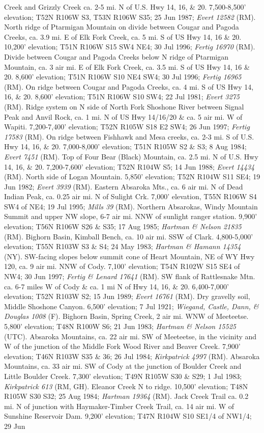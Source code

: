 Creek and Grizzly Creek ca. 2-5 mi. N of U.S. Hwy 14, 16, \& 20. 7,500-8,500’ elevation; T52N R106W S3, T53N R106W S35; 25 Jun 1987; \textit{Evert 12582} (RM).  North ridge of Ptarmigan Mountain on divide between Cougar and Pagoda Creeks, ca. 3.9 mi. E of Elk Fork Creek, ca. 5 mi. S of US Hwy 14, 16 \& 20. 10,200’ elevation; T51N R106W S15 SW4 NE4; 30 Jul 1996; \textit{Fertig 16970} (RM).  Divide between Cougar and Pagoda Creeks below N ridge of Ptarmigan Mountain, ca. 3 air mi. E of Elk Fork Creek, ca. 3.5 mi. S of US Hwy 14, 16 \& 20. 8,600’ elevation; T51N R106W S10 NE4 SW4; 30 Jul 1996; \textit{Fertig 16965} (RM).  On ridge between Cougar and Pagoda Creeks, ca. 4 mi. S of US Hwy 14, 16, \& 20. 8,600’ elevation; T51N R106W S10 SW4; 22 Jul 1981; \textit{Evert 3275} (RM).  Ridge system on N side of North Fork Shoshone River between Signal Peak and Anvil Rock, ca. 1 mi. N of US Hwy 14/16/20 \& ca. 5 air mi. W of Wapiti. 7,200-7,400’ elevation; T52N R105W S18 E2 SW4; 26 Jun 1997; \textit{Fertig 17583} (RM).  On ridge between Fishhawk and Mesa creeks, ca. 2-3 mi. S of U.S. Hwy 14, 16, \& 20. 7,000-8,000’ elevation; T51N R105W S2 \& S3; 8 Aug 1984; \textit{Evert 7451} (RM).  Top of Four Bear (Black) Mountain, ca. 2.5 mi. N of U.S. Hwy 14, 16, \& 20. 7,200-7,600’ elevation; T52N R104W S5; 14 Jun 1988; \textit{Evert 14434} (RM).  North side of Logan Mountain. 5,850’ elevation; T52N R104W S11 SE4; 19 Jun 1982; \textit{Evert 3939} (RM).  Eastern Absaroka Mts., ca. 6 air mi. N of Dead Indian Peak, ca. 0.25 air mi. N of Sulight Crk.  7,000’ elevation, T55N R106W S4 SW4 of NE4; 19 Jul 1995; \textit{Mills 39} (RM).  Northern Absarokas, Windy Mountain Summit and upper NW slope, 6-7 air mi. NNW of sunlight ranger station.  9,900’ elevation; T56N R106W S26 \& S35; 17 Aug 1985; \textit{Hartman \& Nelson 21835} (RM).  Bighorn Basin, Kimball Bench, ca. 10 air mi. SSW of Clark.  4,800-5,000’ elevation; T55N R103W S3 \& S4; 24 May 1983; \textit{Hartman \& Hamann 14354} (NY).  SW-facing slopes below summit cone of Heart Mountain, NE of WY Hwy 120, ca. 9 air mi. NNW of Cody.  7,100’ elevation; T54N R102W S15 SE4 of NW4; 30 Jun 1997; \textit{Fertig \& Lenard 17641} (RM).  SW flank of Rattlesnake Mtn. ca. 6-7 miles W of Cody \& ca. 1 mi N of Hwy 14, 16, \& 20. 6,400-7,000' elevation; T52N R103W S2; 15 Jun 1989; \textit{Evert 16761} (RM).  Dry gravelly soil, Middle Shoshone Canyon.  6,500’ elevation; 7 Jul 1921; \textit{Wiegand, Castle, Dann, \& Douglas 1008} (F).  Bighorn Basin, Spring Creek, 2 air mi. WNW of Meeteetse.  5,800’ elevation; T48N R100W S6; 21 Jun 1983; \textit{Hartman \& Nelson 15525} (UTC).  Absaroka Mountains, ca. 22 air mi. SW of Meeteetse, in the vicinity and W of the junction of the Middle Fork Wood River and Beaver Creek.  7,900’ elevation; T46N R103W S35 \& 36; 26 Jul 1984; \textit{Kirkpatrick 4997} (RM).  Absaroka Mountains, ca. 33 air mi. SW of Cody at the junction of Boulder Creek and Little Boulder Creek. 7,300’ elevation; T49N R105W S30 \& S29; 1 Jul 1983; \textit{Kirkpatrick 613} (RM, GH).  Eleanor Creek N to ridge. 10,500’ elevation; T48N R105W S30 S32; 25 Aug 1984; \textit{Hartman 19364} (RM).  Jack Creek Trail ca. 0.2 mi. N of junction with Haymaker-Timber Creek Trail, ca. 14 air mi. W of Sunshine Reservoir Dam.  9,200’ elevation; T47N R104W S10 SE1/4 of NW1/4; 29 Jun 